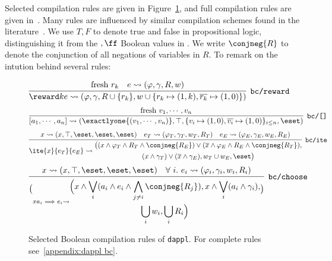 Selected compilation rules are given in Figure~\ref{fig:dappl bc},
and full compilation rules are given in~\citet{cho2025scaling}.
Many rules are
influenced by similar compilation schemes found in the
literature~\citep{holtzen2020scaling,de2007problog,saad2021sppl}.
We use $T,F$ to denote true and false in propositional logic,
distinguishing it from the $\tt,\ff$ Boolean values in \dappl.
We write $\conjneg{R}$ to denote the conjunction of all
negations of variables in $R$. To remark on the intution behind
several rules:

\begin{figure}
\begin{mdframed}
{\footnotesize
\begin{align*}
  \infer[\texttt{bc/reward}]
  {
    \reward k  e \leadsto
    (\varphi, \gamma, R \cup \{r_k\},
      w \cup \{r_k \mapsto (1,k), \overline{r_k} \mapsto (1,0)\})}
  {
    \text{fresh } r_k
    & e \leadsto (\varphi, \gamma, R,w)
  }
\end{align*}
\begin{align*}
  \infer[\texttt{bc/[]}]
  {[a_1, \cdots, a_n] \leadsto
  (\exactlyone{(v_1,\cdots, v_n)}, \top, \{v_i \mapsto (1,0), \overline{v_i} \mapsto (1,0)\}_{i \leq n}, \eset )}
  {\text{fresh }v_1, \cdots, v_n}
\end{align*}
\begin{align*}
  \infer[\texttt{bc/ite}]
  {
    \ite{x}{e_T}{e_E} \leadsto
    \begin{gathered}
      \big(
        (x \land \varphi_T \land R_T \land \conjneg{R_E})
          \lor (\overline{x} \land \varphi_E \land R_E \land \conjneg{R_T}), \\
        (x \land \gamma_T) \lor (\overline{x} \land \gamma_E),
        w_T \cup w_E,
        \eset \big)
    \end{gathered}
  } {
    x \leadsto
    (x, \top, \eset, \eset, \eset)
    &
    e_T \leadsto
    (\varphi_T, \gamma_T, w_T, R_T)
    &
    e_E \leadsto
    (\varphi_E, \gamma_E, w_E, R_E)
  }
\end{align*}
\begin{align*}
  \infer[\texttt{bc/choose}]
  {\choose x {a_i \implies e_i}
  \leadsto
  \begin{gathered}
    \Big(x \land \bigvee_i (a_i \land e_i
    \land \bigwedge_{j \neq i} \conjneg{R_j}),
    x \land \bigvee_i (a_i \land \gamma_i), \\
    \bigcup_i w_i, \bigcup_i R_i \Big)
  \end{gathered}
}
  {x \leadsto
  (x, \top, \eset, \eset, \eset)
  &
  \forall \ i.  \ e_i \leadsto (\varphi_i, \gamma_i, w_i, R_i)}
\end{align*}
}
\end{mdframed}
\caption{Selected Boolean compilation rules of \texttt{dappl}.
For complete rules see~\cref{appendix:dappl bc}.
}
\label{fig:dappl bc}
\end{figure}

